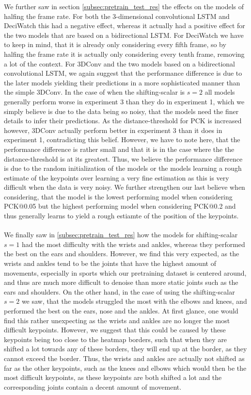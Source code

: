 \documentclass[./main.tex]{subfiles}
\begin{document}
We further saw in section \ref{subsec:pretrain_test_res} the effects on the models of halfing the frame rate. For both the 3-dimensional convolutional LSTM and DeciWatch this had a negative effect, whereas it actually had a positive effect for the two models that are based on a bidirectional LSTM. For DeciWatch we have to keep in mind, that it is already only considering every fifth frame, so by halfing the frame rate it is actually only considering every tenth frame, removing a lot of the context. For 3DConv and the two models based on a bidirectional convolutional LSTM, we again suggest that the performance difference is due to the later models yielding their predictions in a more sophisticated manner than the simple 3DConv. In the case of when the shifting-scalar is $s = 2$ all models generally perform worse in experiment 3 than they do in experiment 1, which we simply believe is due to the data being so noisy, that the models need the finer details to infer their predictions. As the distance-threshold for PCK is increased however, 3DConv actually perform better in experiment 3 than it does in experiment 1, contradicting this belief. However, we have to note here, that the performance difference is rather small and that it is in the case where the the distance-threshold is at its greatest. Thus, we believe the performance difference is due to the random initialization of the models or the models learning a rough estimate of the keypoints over learning a very fine estimation as this is very difficult when the data is very noisy. We further strengthen our last believe when considering, that the model is the lowest performing model when considering PCK@0.05 but the highest performing model when considering PCK@0.2 and thus generally learns to yield a rough estiamte of the position of the keypoints.
\\
\\
We finally saw in \ref{subsec:pretrain_test_res} how the models for shifting-scalar $s = 1$ had the most difficulty with the wrists and ankles, whereas they performed the best on the ears and shoulders. However, we find this very expected, as the wrists and ankles tend to be the joints that have the highest amount of movements, especially in sports which our pretraining dataset is centered around, and thus are much more difficult to denoise than more static joints such as the ears and shoulders. On the other hand, in the case of using the shifting-scalar $s = 2$ we saw, that the models struggled the most with the elbows and knees, and performed the best on the ears, nose and the ankles. At first glance, one would find this rather unexpecting as the wrists and ankles are no longer the most difficult keypoints. However, we suggest that this could be caused by these keypoints being too close to the heatmap borders, such that when they are shifted a lot towards any of these borders, they will end up at the border, as they cannot exceed the border. Thus, the wrists and ankles are actually not shifted as far as the other keypoints, such as the knees and elbows which would then be the most difficult keypoints, as these keypoints are both shifted a lot and the corresponding joints contain a decent amount of movement.
\end{document}
